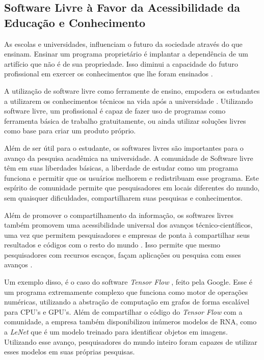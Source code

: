 \subsection{Software Livre à Favor da Acessibilidade da Educação e Conhecimento}

As escolas e universidades, influenciam o futuro da sociedade através do que ensinam. Ensinar um programa proprietário é implantar a dependência de um artifício que não é de sua propriedade. Isso diminui a capacidade do futuro profissional em exercer os conhecimentos que lhe foram ensinados \cite{RichardStallman}.  

A utilização de software livre como ferramente de ensino, empodera os estudantes a utilizarem os conhecimentos técnicos na vida após a universidade \cite{Lessig2002}. Utilizando software livre, um profissional é capaz de fazer uso de programas como ferramenta básica de trabalho gratuitamente, ou ainda utilizar soluções livres como base para criar um produto próprio.

Além de ser útil para o estudante, os softwares livres são importantes para o avanço da pesquisa acadêmica na universidade. A comunidade de Software livre têm em suas liberdades básicas, a liberdade de estudar como um programa funciona e permitir que os usuários melhorem e redistribuam esse programa. Este espírito de comunidade permite que pesquisadores em locais diferentes do mundo, sem quaisquer dificuldades, compartilharem suas pesquisas e conhecimentos.  

Além de promover o compartilhamento da informação, os softwares livres também promovem uma  acessibilidade universal dos avanços técnico-científicos, uma vez que permitem pesquisadores e empresas de ponta à compartilhar seus resultados e códigos com o resto do mundo \cite{Lessig2002}. Isso permite que mesmo pesquisadores com recursos escaços, façam aplicações ou pesquisa com esses avanços .

Um exemplo disso, é o caso do software \textit{Tensor Flow} \cite{AbadiABBCCCDDDG16}, feito pela Google. Esse é um programa extremamente complexo que funciona como motor de operações numéricas, utilizando a abstração de computação em grafos de forma escalável para CPU's e GPU's. Além de compartilhar o código do \textit{Tensor Flow} com a comunidade, a empresa também disponibilizou inúmeros modelos de RNA, como a \textit{LeNet} \cite{szegedy2015going} que é um modelo treinado para identificar objetos em imagens. Utilizando esse avanço, pesquisadores do mundo inteiro foram capazes de utilizar esses modelos em suas próprias pesquisas.








